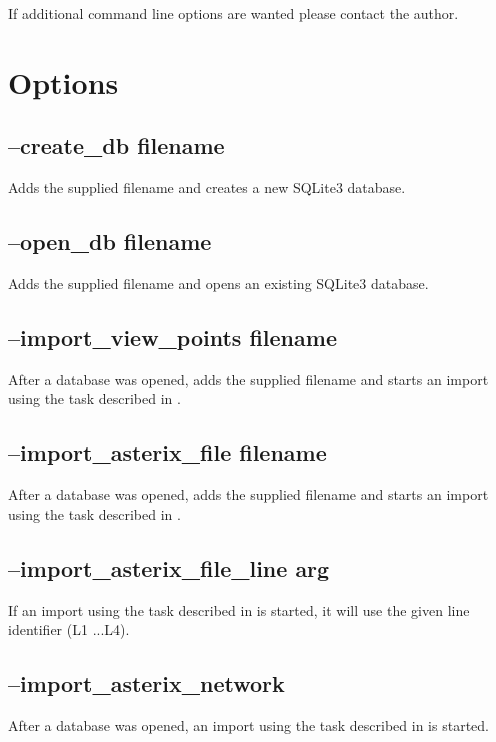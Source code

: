 If additional command line options are wanted please contact the author.

\section{Options}

\subsection{--create\_db filename}

Adds the supplied filename and creates a new SQLite3 database.
 
\subsection{--open\_db filename}

Adds the supplied filename and opens an existing SQLite3 database.

\subsection{--import\_view\_points filename}

After a database was opened, adds the supplied filename and starts an import using the task described in .
 
\subsection{--import\_asterix\_file filename}

After a database was opened, adds the supplied filename and starts an import using the task described in .

\subsection{--import\_asterix\_file\_line arg}

If an import using the task described in  is started, it will use the given line identifier (L1 ...L4).

\subsection{--import\_asterix\_network}

After a database was opened, an import using the task described in  is started.

